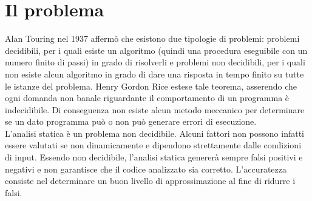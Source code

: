\section{Il problema}
Alan Touring\cite{CITAZIONE} nel 1937 affermò che esistono due tipologie di problemi: problemi decidibili, per i quali esiste un algoritmo (quindi una procedura eseguibile con un numero finito di passi) in grado di risolverli e problemi non decidibili, per i quali non esiste alcun algoritmo in grado di dare una risposta in tempo finito su tutte le istanze del problema. Henry Gordon Rice estese tale teorema, asserendo che ogni domanda non banale riguardante il comportamento di un programma è indecidibile. Di conseguenza non esiste alcun metodo meccanico per determinare se un dato programma può o non può generare errori di esecuzione.\\
L'analisi statica è un problema non decidibile. Alcuni fattori non possono infatti essere valutati se non dinamicamente e dipendono strettamente dalle condizioni di input. Essendo non decidibile, l'analisi statica genererà sempre falsi positivi e negativi e non garantisce che il codice analizzato sia corretto. L'accuratezza consiste nel determinare un buon livello di approssimazione al fine di ridurre i falsi.

